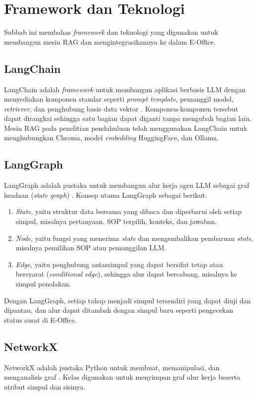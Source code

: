 \section{Framework dan Teknologi}
\label{sec:teknologi}
Subbab ini membahas \textit{framework} dan teknologi yang digunakan untuk membangun mesin RAG dan mengintegrasikannya ke dalam E-Office.

\subsection{LangChain}
LangChain adalah \textit{framework} untuk membangun aplikasi berbasis LLM dengan menyediakan komponen standar seperti \textit{prompt template}, pemanggil model, \textit{retriever}, dan penghubung basis data vektor \parencite{chase2022langchain}. Komponen-komponen tersebut dapat dirangkai sehingga satu bagian dapat diganti tanpa mengubah bagian lain. Mesin RAG pada penelitian pendahuluan telah menggunakan LangChain untuk menghubungkan Chroma, model \textit{embedding} HuggingFace, dan Ollama.

\subsection{LangGraph}
LangGraph adalah pustaka untuk membangun alur kerja agen LLM sebagai graf keadaan (\textit{state graph}) \parencite{langgraph2024}. Konsep utama LangGraph sebagai berikut:
\begin{enumerate}
\item \textit{State}, yaitu struktur data bersama yang dibaca dan diperbarui oleh setiap simpul, misalnya pertanyaan, SOP terpilih, konteks, dan jawaban.
\item \textit{Node}, yaitu fungsi yang menerima \textit{state} dan mengembalikan pembaruan \textit{state}, misalnya pemilihan SOP atau pemanggilan LLM.
\item \textit{Edge}, yaitu penghubung antarsimpul yang dapat bersifat tetap atau bersyarat (\textit{conditional edge}), sehingga alur dapat bercabang, misalnya ke simpul penolakan.
\end{enumerate}

Dengan LangGraph, setiap tahap \wgr{} menjadi simpul tersendiri yang dapat diuji dan dipantau, dan alur dapat ditambah dengan simpul baru seperti pengecekan status surat di E-Office.

\subsection{NetworkX}
NetworkX adalah pustaka Python untuk membuat, memanipulasi, dan menganalisis graf \parencite{hagberg2008networkx}. Kelas  digunakan untuk menyimpan graf alur kerja beserta atribut simpul dan sisinya.

